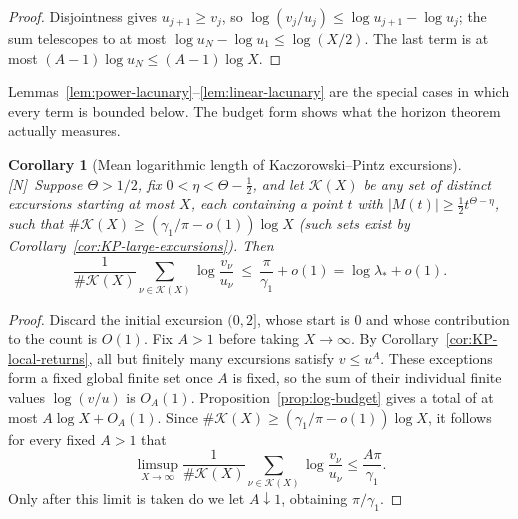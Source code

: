 \documentclass[11pt]{amsart}
\numberwithin{equation}{section}
\theoremstyle{plain}
\newtheorem{corollary}[theorem]{Corollary}
\theoremstyle{definition}
\theoremstyle{remark}
\newcommand{\tagN}{\textup{[N]}}
\begin{document}
\begin{proof}
Disjointness gives $u_{j+1}\ge v_j$, so
$\log(v_j/u_j)\le\log u_{j+1}-\log u_j$; the sum telescopes to at most
$\log u_N-\log u_1\le\log(X/2)$. The last term is at most
$(A-1)\log u_N\le(A-1)\log X$.
\end{proof}

Lemmas~\ref{lem:power-lacunary}--\ref{lem:linear-lacunary} are the special
cases in which every term is bounded below. The budget form shows what the
horizon theorem actually measures.

\begin{corollary}[Mean logarithmic length of Kaczorowski--Pintz excursions]
\label{cor:KP-mean-log-length}
\tagN\ Suppose $\Theta>1/2$, fix $0<\eta<\Theta-\frac12$, and let $\mathcal K(X)$
be any set of distinct excursions starting at most $X$, each containing a
point $t$ with $|M(t)|\ge\frac12t^{\Theta-\eta}$, such that
$\#\mathcal K(X)\ge(\gamma_1/\pi-o(1))\log X$ (such sets exist by
Corollary~\ref{cor:KP-large-excursions}). Then
\[
\frac1{\#\mathcal K(X)}\sum_{\nu\in\mathcal K(X)}\log\frac{v_\nu}{u_\nu}
\ \le\ \frac{\pi}{\gamma_1}+o(1)=\log\lambda_*+o(1).
\]
\end{corollary}

\begin{proof}
Discard the initial excursion $(0,2]$, whose start is $0$ and whose
contribution to the count is $O(1)$. Fix $A>1$ before taking $X\to\infty$.
By Corollary~\ref{cor:KP-local-returns}, all but finitely many excursions
satisfy $v\le u^A$. These exceptions form a fixed global finite set once
$A$ is fixed, so the sum of their individual finite values $\log(v/u)$ is
$O_A(1)$. Proposition~\ref{prop:log-budget} gives a total of at most
$A\log X+O_A(1)$. Since
$\#\mathcal K(X)\ge(\gamma_1/\pi-o(1))\log X$, it follows for every fixed
$A>1$ that
\[
\limsup_{X\to\infty}
\frac1{\#\mathcal K(X)}\sum_{\nu\in\mathcal K(X)}
\log\frac{v_\nu}{u_\nu}
\le \frac{A\pi}{\gamma_1}.
\]
Only after this limit is taken do we let $A\downarrow1$, obtaining
$\pi/\gamma_1$.
\end{proof}
\end{document}

